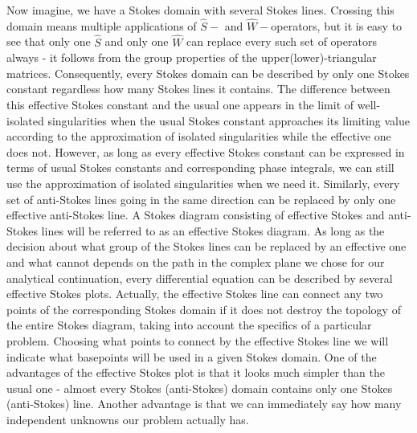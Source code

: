 \documentclass[12pt]{iopart}
\def\S{\hat{S}}
\def\W{\hat{W}}
\begin{document}
Now imagine, we have a Stokes domain with several Stokes lines. Crossing this domain means multiple applications of $\S-$ and $\W-$operators, but it is easy to see that only one $\S$ and only one $\W$ can replace every such set of operators always - it follows from the group properties of the upper(lower)-triangular matrices. Consequently, every Stokes domain can be described by only one Stokes constant regardless how many Stokes lines it contains. The difference between this effective Stokes constant and the usual one appears in the limit of well-isolated singularities when the usual Stokes constant approaches its limiting value according to the approximation of isolated singularities while the effective one does not. However, as long as every effective Stokes constant can be expressed in terms of usual Stokes constants and corresponding phase integrals, we can still use the approximation of isolated singularities when we need it. Similarly, every set of anti-Stokes lines going in the same direction can be replaced by only one effective anti-Stokes line. A Stokes diagram consisting of effective Stokes and anti-Stokes lines will be referred to as an effective Stokes diagram. As long as the decision about what group of the Stokes lines can be replaced by an effective one and what cannot depends on the path in the complex plane we chose for our analytical continuation, every differential equation can be described by several effective Stokes plots. Actually, the effective Stokes line can connect any two points of the corresponding Stokes domain if it does not destroy the topology of the entire Stokes diagram, taking into account the specifics of a particular problem. Choosing what points to connect by the effective Stokes line we will indicate what basepoints will be used in a given Stokes domain. One of the advantages of the effective Stokes plot is that it looks much simpler than the usual one - almost every Stokes (anti-Stokes) domain contains only one Stokes (anti-Stokes) line. Another advantage is that we can immediately say how many independent unknowns our problem actually has. 
\end{document}
